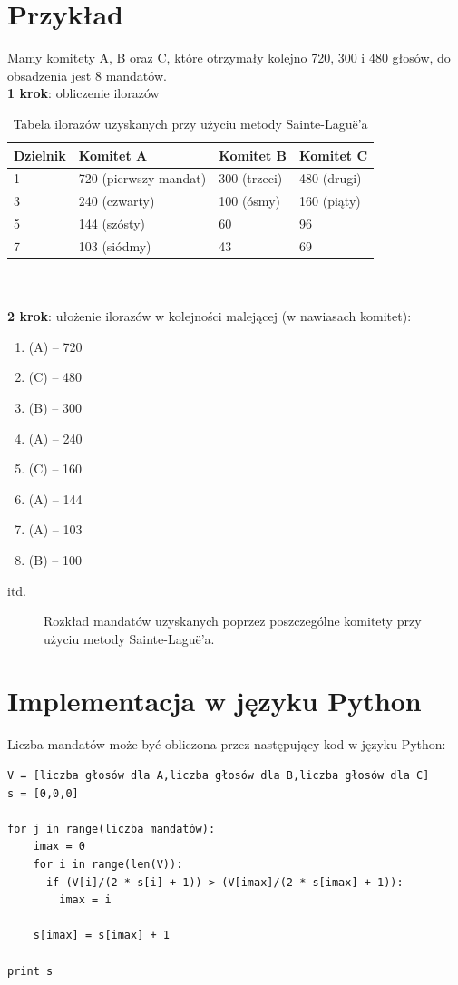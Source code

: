 \documentclass[12pt,a4paper,titlepage]{report}
\begin{document}
\section{Przykład}
Mamy komitety A, B oraz C, które otrzymały kolejno 720, 300 i 480 głosów, do obsadzenia jest 8 mandatów. \\
\textbf{1 krok}: obliczenie ilorazów \\ 
\begin{table}[h]
\begin{tabular}{|l|l|l|l|} \hline
Dzielnik & Komitet A & Komitet B & Komitet C \\
\hline
1 & 720 (pierwszy mandat) & 300 (trzeci) & 480 (drugi) \\
\hline
3 & 240 (czwarty) & 100 (ósmy) & 160 (piąty) \\
\hline
5 & 144 (szósty) & 60 & 96 \\ 
\hline
7 & 103 (siódmy) & 43 & 69 \\
\hline

\end{tabular}
\caption{Tabela ilorazów uzyskanych przy użyciu metody Sainte-Laguë'a}
\end{table}\\ \\
\textbf{2 krok}: ułożenie ilorazów w kolejności malejącej (w nawiasach komitet):
\begin{enumerate}
\item (A) – 720
\item (C) – 480
\item (B) – 300
\item (A) – 240
\item (C) – 160
\item (A) – 144
\item (A) – 103
\item (B) – 100
\end{enumerate} 
itd. 
\begin{figure} [!htbp]
\caption{Rozkład mandatów uzyskanych poprzez poszczególne komitety przy użyciu metody  Sainte-Laguë'a.}
\end{figure}\cite{wiki:msl}
\newpage
\section{Implementacja w języku Python}
Liczba mandatów może być obliczona przez następujący kod w języku Python: 
\begin{verbatim}
V = [liczba głosów dla A,liczba głosów dla B,liczba głosów dla C]
s = [0,0,0]

for j in range(liczba mandatów):
    imax = 0
    for i in range(len(V)):
      if (V[i]/(2 * s[i] + 1)) > (V[imax]/(2 * s[imax] + 1)):
        imax = i

    s[imax] = s[imax] + 1

print s
\end{verbatim}
\newpage
\end{document}
